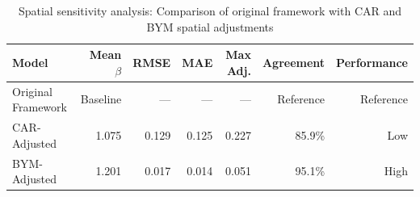 \begin{table}
\caption{Spatial sensitivity analysis: Comparison of original framework with CAR and BYM spatial adjustments}
\label{tab:spatial_sensitivity}
\centering
\begin{tabular}{lrrrrrr}
\toprule
Model & Mean $\beta$ & RMSE & MAE & Max Adj. & Agreement & Performance \\
\midrule
Original Framework & Baseline & --- & --- & --- & Reference & Reference \\
CAR-Adjusted & 1.075 & 0.129 & 0.125 & 0.227 & 85.9\% & Low \\
BYM-Adjusted & 1.201 & 0.017 & 0.014 & 0.051 & 95.1\% & High \\
\bottomrule
\end{tabular}
\end{table}
